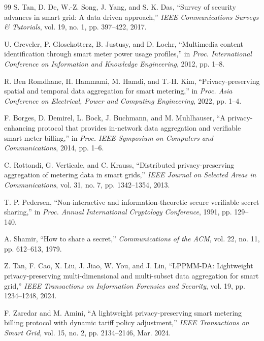 \documentclass[conference]{IEEEtran}
\begin{document}
\begin{thebibliography}{99}
S. Tan, D. De, W.-Z. Song, J. Yang, and S. K. Das, ``Survey of security advances in smart grid: A data driven approach,'' \textit{IEEE Communications Surveys \& Tutorials}, vol. 19, no. 1, pp. 397--422, 2017.

U. Greveler, P. Glosekotterz, B. Justusy, and D. Loehr, ``Multimedia content identification through smart meter power usage profiles,'' in \textit{Proc. International Conference on Information and Knowledge Engineering}, 2012, pp. 1--8.

R. Ben Romdhane, H. Hammami, M. Hamdi, and T.-H. Kim, ``Privacy-preserving spatial and temporal data aggregation for smart metering,'' in \textit{Proc. Asia Conference on Electrical, Power and Computing Engineering}, 2022, pp. 1--4.

F. Borges, D. Demirel, L. Bock, J. Buchmann, and M. Muhlhauser, ``A privacy-enhancing protocol that provides in-network data aggregation and verifiable smart meter billing,'' in \textit{Proc. IEEE Symposium on Computers and Communications}, 2014, pp. 1--6.

C. Rottondi, G. Verticale, and C. Krauss, ``Distributed privacy-preserving aggregation of metering data in smart grids,'' \textit{IEEE Journal on Selected Areas in Communications}, vol. 31, no. 7, pp. 1342--1354, 2013.

T. P. Pedersen, ``Non-interactive and information-theoretic secure verifiable secret sharing,'' in \textit{Proc. Annual International Cryptology Conference}, 1991, pp. 129--140.

A. Shamir, ``How to share a secret,'' \textit{Communications of the ACM}, vol. 22, no. 11, pp. 612--613, 1979.

Z. Tan, F. Cao, X. Liu, J. Jiao, W. You, and J. Lin, ``LPPMM-DA: Lightweight privacy-preserving multi-dimensional and multi-subset data aggregation for smart grid,'' \textit{IEEE Transactions on Information Forensics and Security}, vol. 19, pp. 1234--1248, 2024.

F. Zaredar and M. Amini, ``A lightweight privacy-preserving smart metering billing protocol with dynamic tariff policy adjustment,'' \textit{IEEE Transactions on Smart Grid}, vol. 15, no. 2, pp. 2134--2146, Mar. 2024.


\end{thebibliography}
\end{document}
